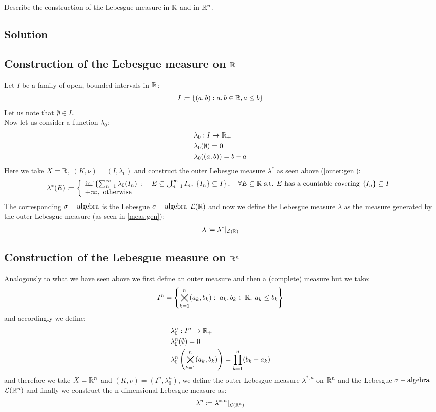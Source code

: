 

\question
Describe the construction of the Lebesgue measure in $\mathbb{R}$ and in $\mathbb{R}^n$.

\subsection*{Solution}

\subsection{Construction of the Lebesgue measure on \texorpdfstring{$\mathbb{R}$}{R}}
Let $I$ be a family of open, bounded intervals in $\mathbb{R}$:
\[
    I \coloneqq \{ (a,b) : a,b\in\mathbb{R}, a\leq b \}
\]
Let us note that $\emptyset\in I$.\\
Now let us consider a function $\lambda_0$:
\begin{align*}
     & \lambda_0 : I \to \mathbb{R}_+   \\
     & \lambda_0 (\emptyset) =0 \\
     & \lambda_0 ((a,b)) = b-a
\end{align*}
Here we take $X=\mathbb{R}$, $(K,\nu)=(I,\lambda_0)$ and construct the outer Lebesgue measure $\lambda^*$ as seen above (\ref{outer:gen}):
\[
    \lambda^*(E) \coloneqq \left\{ \begin{array}{l}
        \inf \left\{ \sum_{n=1}^{\infty} \lambda_0(I_n) \, : \quad E\subseteq \bigcup_{n=1}^{\infty} I_n ,\; \{ I_n \}\subseteq I \right\}, \quad \forall E\subseteq\mathbb{R} \text{ s.t. } E \text{ has a countable covering }\{ I_n \}\subseteq I \\
        +\infty, \text{ otherwise}
    \end{array}\right.
\]
The corresponding $\sigma-\text{algebra}$ is the Lebesgue $\sigma-\text{algebra}$ $\mathcal{L}(\mathbb{R})$ and now we define the Lebesgue measure $\lambda$ as the measure generated by the outer Lebesgue measure (as seen in \ref{meas:gen}):
\[
    \lambda \coloneqq \lambda^*|_{\mathcal{L}(\mathbb{R})}
\]

\subsection{Construction of the Lebesgue measure on \texorpdfstring{$\mathbb{R}^n$}{Rn}}
Analogously to what we have seen above we first define an outer measure and then a (complete) measure but we take:
\[
    I^n = \left\{ \bigtimes_{k=1}^{n} (a_k,b_k): \; a_k,b_k\in\mathbb{R}, \; a_k\leq b_k  \right\}
\]
and accordingly we define:
\begin{align*}
     & \lambda_0^n : I^n \to \mathbb{R}_+                                                         \\
     & \lambda_0^n (\emptyset) = 0                                                        \\
     & \lambda_0^n \left( \bigtimes_{k=1}^{n} (a_k,b_k) \right) = \prod_{k=1}^n (b_k-a_k)
\end{align*}
and therefore we take $X=\mathbb{R}^n$ and $(K,\nu)=(I^n,\lambda_0^n)$, we define the outer Lebesgue measure $\lambda^{*,n}$ on $\mathbb{R}^n$ and the Lebesgue $\sigma-\text{algebra}$ $\mathcal{L}(\mathbb{R}^n)$ and finally we construct the n-dimensional Lebesgue measure as:
\[
    \lambda^n \coloneqq \lambda^{*,n} |_{\mathcal{L}(\mathbb{R}^n)}
\]
